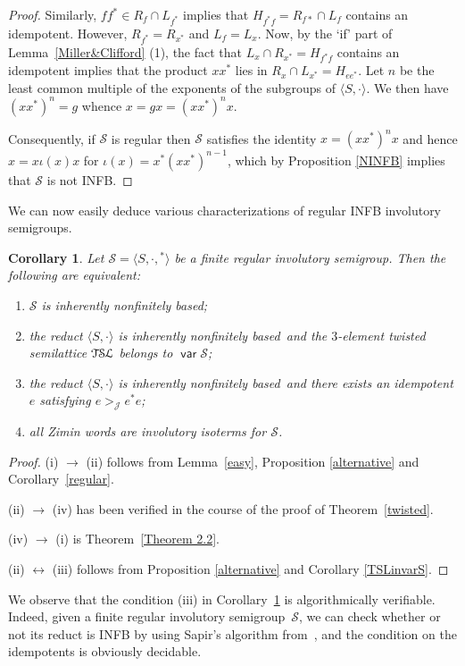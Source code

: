 \documentclass[smallextended]{svjour3}
\def\Jc{\mathrel{\mathscr{J}}}
\newcommand{\is}{involutory semi\-group}
\newcommand{\iss}{involutory semi\-groups}
\newcommand{\infb}{inherently non\-finitely based}
\newcommand{\TSL}{\ensuremath{\mathcal{T\kern-.5pt S\kern-.5pt L}}}
\newtheorem{Cor}[Thm]{Corollary}
\DeclareMathOperator{\var}{\mathsf{var}}
\begin{document}
\begin{proof}
Similarly, $ff^*\in R_f\cap L_{f^*}$ implies that $H_{f^*f}=R_{f*}\cap L_f$ contains an idempotent. However, $R_{f^*}=R_{x^*}$ and
$L_f=L_x$. Now, by the `if' part of Lemma~\ref{Miller&Clifford} (1), the fact that $L_x\cap R_{x^*}=H_{f^*f}$ contains an idempotent implies
that the product $xx^*$ lies in $R_x\cap L_{x^*}=H_{ee^*}$. Let $n$ be the least common multiple of the exponents of the subgroups of $\langle
S,\cdot\rangle$. We then have $(xx^*)^n=g$ whence $x=gx=(xx^*)^nx$.

Consequently, if $\mathcal{S}$ is regular then $\mathcal{S}$ satisfies the identity $x=(xx^*)^nx$ and hence
$x=x\iota\!(x)x$ for $\iota\!(x)=x^*(xx^*)^{n-1}$, which by Proposition \ref{NINFB} implies that $\mathcal{S}$ is not INFB.
\end{proof}


We can now easily deduce various characterizations of regular INFB \iss.
\renewcommand{\labelenumi}{\emph{(\roman{enumi})}}
\begin{Cor}
\label{characterization} Let $\mathcal{S}=\langle S,\cdot,{}^*\rangle$ be a finite regular \is. Then the following are equivalent:
\begin{enumerate}
\item $\mathcal{S}$ is \infb;
\item the reduct $\langle S,\cdot\rangle$ is \infb\ and the $3$-element twisted semilattice $\TSL$ belongs to $\var\mathcal{S}$;
\item the reduct $\langle S,\cdot\rangle$ is \infb\ and there exists an idempotent $e$ satisfying $e\mathrel{{>}_{\!\!\!\Jc}} e^*e$;
\item all Zimin words are involutory isoterms for $\mathcal{S}$.
\end{enumerate}
\end{Cor}

\begin{proof}
(i) $\to$ (ii) follows from Lemma~\ref{easy}, Proposition \ref{alternative} and Corollary~\ref{regular}.

(ii) $\to$ (iv) has been verified in the course of the proof of Theorem~\ref{twisted}.

(iv) $\to$ (i) is Theorem~\ref{Theorem 2.2}.

(ii) $\leftrightarrow$ (iii) follows from Proposition \ref{alternative} and Corollary \ref{TSLinvarS}.
\end{proof}

We observe that the condition (iii) in Corollary~\ref{characterization} is algorithmically verifiable. Indeed, given a finite
regular \is\ $\mathcal{S}$, we can check whether or not its reduct is INFB by using Sapir's algorithm from~\cite{Sapir:1987},
and the condition on the idempotents is obviously decidable.
\end{document}
